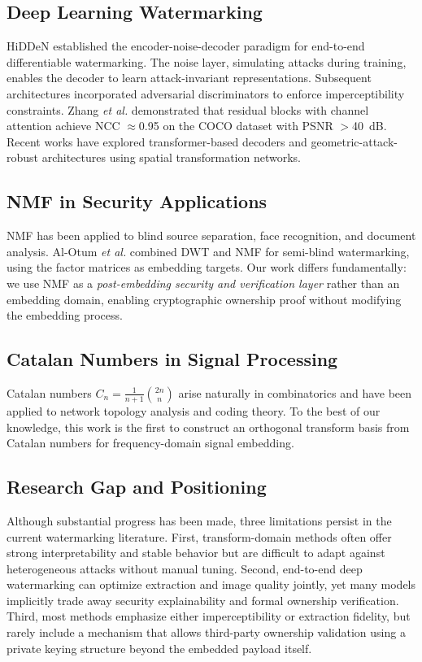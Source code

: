 \documentclass[journal]{IEEEtran}
\begin{document}
\subsection{Deep Learning Watermarking}

HiDDeN \cite{zhu2018hidden} established the encoder-noise-decoder
paradigm for end-to-end differentiable watermarking. The noise layer,
simulating attacks during training, enables the decoder to learn
attack-invariant representations. Subsequent architectures incorporated
adversarial discriminators to enforce imperceptibility constraints.
Zhang \textit{et al.} \cite{zhang2022robust} demonstrated that residual
blocks with channel attention achieve NCC $\approx$0.95 on the COCO
dataset with PSNR $>$40~dB. Recent works have explored transformer-based
decoders \cite{al-otum2023} and geometric-attack-robust architectures
using spatial transformation networks.

\subsection{NMF in Security Applications}

NMF has been applied to blind source separation, face recognition, and
document analysis. Al-Otum \textit{et al.} \cite{al-otum2023} combined
DWT and NMF for semi-blind watermarking, using the factor matrices as
embedding targets. Our work differs fundamentally: we use NMF as a
\emph{post-embedding security and verification layer} rather than an
embedding domain, enabling cryptographic ownership proof without
modifying the embedding process.

\subsection{Catalan Numbers in Signal Processing}

Catalan numbers $C_n = \frac{1}{n+1}\binom{2n}{n}$ arise naturally in
combinatorics and have been applied to network topology analysis and
coding theory. To the best of our knowledge, this work is the first to
construct an orthogonal transform basis from Catalan numbers for
frequency-domain signal embedding.

\subsection{Research Gap and Positioning}

Although substantial progress has been made, three limitations persist in
the current watermarking literature. First, transform-domain methods often
offer strong interpretability and stable behavior but are difficult to
adapt against heterogeneous attacks without manual tuning. Second,
end-to-end deep watermarking can optimize extraction and image quality
jointly, yet many models implicitly trade away security explainability and
formal ownership verification. Third, most methods emphasize either
imperceptibility or extraction fidelity, but rarely include a mechanism
that allows third-party ownership validation using a private keying
structure beyond the embedded payload itself.
\end{document}
